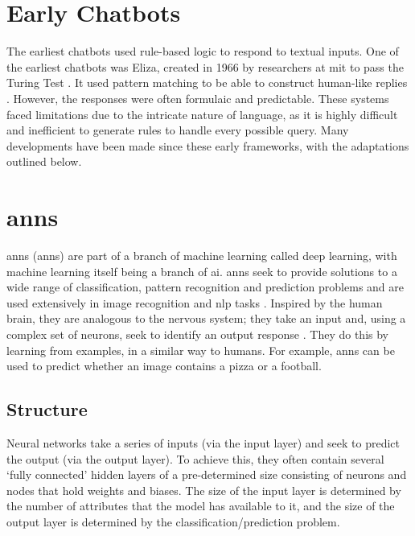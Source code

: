 \section{Early Chatbots}\label{sec:background_early_chatbots}
The earliest chatbots used rule-based logic to respond to textual inputs. One of the earliest chatbots was Eliza, created in 1966 by researchers at \acrshort{mit} to pass the Turing Test \citep{zemvcik2019}. It used pattern matching to be able to construct human-like replies \citep{Luka}. However, the responses were often formulaic and predictable. These systems faced limitations due to the intricate nature of language, as it is highly difficult and inefficient to generate rules to handle every possible query. Many developments have been made since these early frameworks, with the adaptations outlined below.


\section{\acrlong{ann}s}\label{sec:background_anns}
\acrlong{ann}s (\acrshort{ann}s) are part of a branch of machine learning called deep learning, with machine learning itself being a branch of \acrlong{ai}. \acrshort{ann}s seek to provide solutions to a wide range of classification, pattern recognition and prediction problems and are used extensively in image recognition and \acrfull{nlp} tasks \citep{Abiodun}. Inspired by the human brain, they are analogous to the nervous system; they take an input and, using a complex set of neurons, seek to identify an output response \citep{Bishop}. They do this by learning from examples, in a similar way to humans. For example, \acrshort{ann}s can be used to predict whether an image contains a pizza or a football.

\subsection{Structure}\label{sec:background_anns_structure}
Neural networks take a series of inputs (via the input layer) and seek to predict the output (via the output layer). To achieve this, they often contain several `fully connected' hidden layers of a pre-determined size consisting of neurons and nodes that hold weights and biases. The size of the input layer is determined by the number of attributes that the model has available to it, and the size of the output layer is determined by the classification/prediction problem. 

